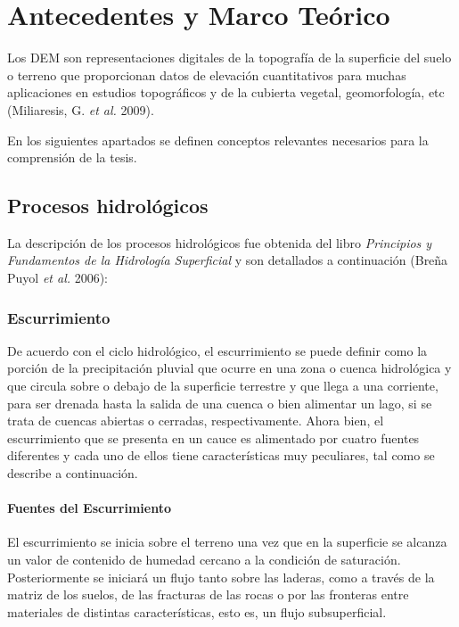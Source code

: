 \documentclass[10pt,a4paper, twoside]{report}
\begin{document}
\chapter{Antecedentes y Marco Teórico}
\label{chap:datosMarcoTeorico}

Los DEM son representaciones digitales de la topografía de la superficie del suelo o terreno que proporcionan datos de elevación cuantitativos para muchas aplicaciones en estudios topográficos y de la cubierta vegetal, geomorfología, etc (Miliaresis, G. \textit{et al.} 2009).

En los siguientes apartados se definen conceptos relevantes necesarios para la comprensión de la tesis.

\section{Procesos hidrológicos}
\label{sec:proc-hidr}

La descripción de los procesos hidrológicos fue obtenida del libro \textit{Principios y Fundamentos de la Hidrología Superficial} y son detallados a continuación (Breña Puyol \textit{et al.} 2006):

\subsection{Escurrimiento}
\label{subsec:escurr}

De acuerdo con el ciclo hidrológico, el escurrimiento se puede definir como la porción de la precipitación pluvial que ocurre en una zona o cuenca hidrológica y que circula sobre o debajo de la superficie terrestre y que llega a una corriente, para ser drenada hasta la salida de una cuenca o bien alimentar un lago, si se trata de cuencas abiertas o cerradas, respectivamente. Ahora bien, el escurrimiento que se presenta en un cauce es alimentado por cuatro fuentes diferentes y cada uno de ellos tiene características muy peculiares, tal como se describe a continuación.

\subsubsection{Fuentes del Escurrimiento}
\label{subsec:fuentesEscurr}

El escurrimiento se inicia sobre el terreno una vez que en la superficie se alcanza un valor de contenido de humedad cercano a la condición de saturación. Posteriormente se iniciará un flujo tanto sobre las laderas, como a través de la matriz de los suelos, de las fracturas de las rocas o por las fronteras entre materiales de distintas características, esto es, un flujo subsuperficial. 
\end{document}
